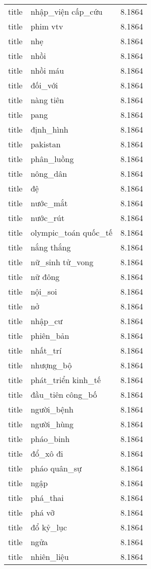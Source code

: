 \documentclass{article}
\begin{document}
\begin{tabular}{lll}
title & nhập\_viện cấp\_cứu & 8.1864\\
title & phim vtv & 8.1864\\
title & nhẹ & 8.1864\\
title & nhồi & 8.1864\\
title & nhồi máu & 8.1864\\
title & đối\_với & 8.1864\\
title & nàng tiên & 8.1864\\
title & pang & 8.1864\\
title & định\_hình & 8.1864\\
title & pakistan & 8.1864\\
title & phân\_luồng & 8.1864\\
title & nông\_dân & 8.1864\\
title & đệ & 8.1864\\
title & nước\_mắt & 8.1864\\
title & nước\_rút & 8.1864\\
title & olympic\_toán quốc\_tế & 8.1864\\
title & nắng thắng & 8.1864\\
title & nữ\_sinh tử\_vong & 8.1864\\
title & nữ đông & 8.1864\\
title & nội\_soi & 8.1864\\
title & nở & 8.1864\\
title & nhập\_cư & 8.1864\\
title & phiên\_bản & 8.1864\\
title & nhất\_trí & 8.1864\\
title & nhượng\_bộ & 8.1864\\
title & phát\_triển kinh\_tế & 8.1864\\
title & đầu\_tiên công\_bố & 8.1864\\
title & người\_bệnh & 8.1864\\
title & người\_hùng & 8.1864\\
title & pháo\_binh & 8.1864\\
title & đổ\_xô đi & 8.1864\\
title & pháo quân\_sự & 8.1864\\
title & ngập & 8.1864\\
title & phá\_thai & 8.1864\\
title & phá vỡ & 8.1864\\
title & đổ kỷ\_lục & 8.1864\\
title & ngửa & 8.1864\\
title & nhiên\_liệu & 8.1864\\

\end{tabular}
\end{document}

